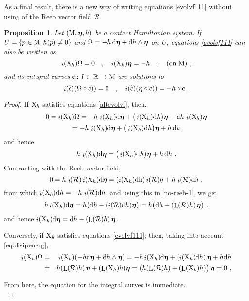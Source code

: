 \documentclass[12pt]{report}
\newtheorem{prop}[teor]{Proposition}
\def\beq{\begin{equation}}
\def\eeq{\end{equation}}
\def\beann{\begin{eqnarray*}}
\def\eeann{\end{eqnarray*}}
\def\qed{\ifvmode\removelastskip\fi
{\unskip\nobreak\hfil\penalty50\hbox{}\nobreak\hfil
\hbox{\vrule height1.2ex width1.2ex}\parfillskip=0pt
\finalhyphendemerits=0 \par\smallskip}}
\def\d{{\rm d}}
\def\h{{\rm h}}
\def\Real{\mathbb{R}}
\def\bmeta{\mbox{\boldmath $\eta$}}
\def\X{{\rm X}}
\def\Lie{\mathop{\rm L}\nolimits}
\def\inn{\mathop{i}\nolimits}
\newcommand{\Reeb}{\mathcal{R}}
\begin{document}
As a final result, there is a new way of writing equations \eqref{evolvf111} 
without using of the Reeb vector field $\Reeb$. 

\begin{prop}
Let $({\rm M},\bmeta,h)$ be a contact Hamiltonian system.
If $U=\{p\in {\rm M};h(p)\not= 0\}$ and $\Omega = -h\,\d\bmeta+\d h\wedge\bmeta$ on~$U$,
equations \eqref{evolvf111} can also be written as
\beq
\label{altevolvf}
\inn(\X_h)\Omega=0 \quad,\quad \inn(\X_h)\bmeta=-h\quad ;
\quad \mbox{\rm (on ${\rm M}$)} \ , 
\eeq
and its integral curves ${\bf c}\colon I\subset\Real\to {\rm M}$ are solutions to
$$
\inn(\widetilde c)(\Omega\circ c)) = 0 \quad , \quad\inn(\widetilde c)(\bmeta\circ c)) = - h\circ{\bf c} \:. 
$$
\end{prop}
\begin{proof}
If $\X_h$ satisfies equations \eqref{altevolvf}, then,
\begin{multline*}
0=\inn(\X_h)\Omega=-h\,\inn(\X_h)\d\bmeta+\big(\inn(\X_h)\d h\big)\bmeta-\d h\,\inn(\X_h)\bmeta\\
= -h\,\inn(\X_h)\d\bmeta+\big(\inn(\X_h)\d h\big)\bmeta+h\,\d h
\end{multline*}
and hence
\beq
\label{no-reeb-1}
h\,\inn(\X_h)\d\bmeta=\big(\inn(\X_h)\d h\big)\bmeta+h\,\d h \ .
\eeq
Contracting with the Reeb vector field,
\begin{equation*}
0=h\,\inn(\Reeb)\inn(\X_h)\d\bmeta =
(\inn(\X_h)\d\h)\inn(\Reeb)\eta+h\,\inn(\Reeb)\d h\ ,
\end{equation*}
from which $\inn(\X_h)\d h=-h\,\inn(\Reeb)\d h$,
and using this in \eqref{no-reeb-1}, we get
\begin{equation*}
h\inn(\X_h)\d\bmeta=
h\big(\d h-(\inn(\Reeb)\d h)\bmeta\big)=
h\big(\d h-(\Lie(\Reeb)h)\,\bmeta\big)\ .
\end{equation*}
and hence $\inn(\X_h)\d\bmeta=\d h-(\Lie(\Reeb)h)\,\bmeta$.
    
Conversely, if $\X_h$ satisfies equations  \eqref{evolvf111}; then, taking into account \eqref{eq:disipenerg},
\beann
\inn(\X_h)\Omega&=&\inn(\X_h)(-h\d\bmeta+\d h\wedge\bmeta)=
-h\inn(\X_h)\d\bmeta+(\inn(\X_h)\d h)\,\bmeta+h\d h
\\ &=& 
h(\Lie(\Reeb)h)\,\bmeta+(\Lie(\X_h)h)\bmeta=
\big(h(\Lie(\Reeb)h)+(\Lie(\X_h)h)\big)\,\bmeta=0 \ ,
\eeann 

From here, the equation for the integral curves is immediate.
\\ \qed\end{proof}
\end{document}
